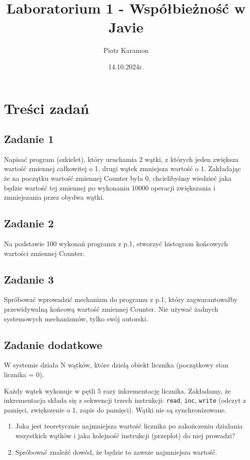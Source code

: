 \documentclass[11pt]{article}
\author{Piotr Karamon}
\date{14.10.2024r.}
\title{Laboratorium 1 - Współbieżność w Javie}
\begin{document}
\maketitle
\section*{Treści zadań}
\label{sec:orgf8834f6}
\subsection*{Zadanie 1}
\label{sec:org3f5ea0c}
Napisać program (szkielet), który uruchamia 2 wątki, z których jeden zwiększa
wartość zmiennej całkowitej o 1, drugi wątek zmniejsza wartość o 1. Zakładając
że na początku wartość zmiennej Counter była 0, chcielibyśmy wiedzieć jaka
będzie wartość tej zmiennej po wykonaniu 10000 operacji zwiększania i
zmniejszania przez obydwa wątki.
\subsection*{Zadanie 2}
\label{sec:orgb40bca8}
Na podstawie 100 wykonań programu z p.1, stworzyć histogram końcowych wartości zmiennej Counter.
\subsection*{Zadanie 3}
\label{sec:org851689d}
Spróbować wprowadzić mechanizm do programu z p.1, który zagwarantowałby przewidywalną końcową wartość zmiennej Counter. Nie używać żadnych systemowych mechanizmów, tylko swój autorski.
\subsection*{Zadanie dodatkowe}
\label{sec:org8871b03}
W systemie działa N wątków, które dzielą obiekt licznika (początkowy stan licznika = 0).

Każdy wątek wykonuje w pętli 5 razy inkrementację licznika. Zakładamy, że inkrementacja składa się z sekwencji trzech instrukcji: \texttt{read}, \texttt{inc}, \texttt{write} (odczyt z pamięci, zwiększenie o 1, zapis do pamięci). Wątki nie są synchronizowane.

\begin{enumerate}
\item Jaka jest teoretycznie najmniejsza wartość licznika po zakończeniu działania wszystkich wątków i jaka kolejność instrukcji (przeplot) do niej prowadzi?
\item Spróbować znaleźć dowód, że będzie to zawsze najmniejsza wartość.
\end{enumerate}
\end{document}
